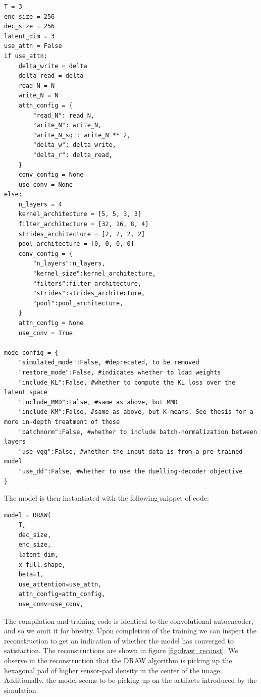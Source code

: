 \begin{lstlisting}[language=iPython]
T = 3
enc_size = 256
dec_size = 256
latent_dim = 3
use_attn = False
if use_attn:
    delta_write = delta
    delta_read = delta
    read_N = N
    write_N = N
    attn_config = {
        "read_N": read_N,
        "write_N": write_N,
        "write_N_sq": write_N ** 2,
        "delta_w": delta_write,
        "delta_r": delta_read,
    }
    conv_config = None
    use_conv = None
else:
    n_layers = 4
    kernel_architecture = [5, 5, 3, 3]
    filter_architecture = [32, 16, 8, 4]
    strides_architecture = [2, 2, 2, 2]
    pool_architecture = [0, 0, 0, 0]
    conv_config = {
        "n_layers":n_layers,
        "kernel_size":kernel_architecture,
        "filters":filter_architecture,
        "strides":strides_architecture,
        "pool":pool_architecture,
    }
    attn_config = None
    use_conv = True
    
mode_config = {
    "simulated_mode":False, #deprecated, to be removed
    "restore_mode":False, #indicates whether to load weights 
    "include_KL":False, #whether to compute the KL loss over the latent space
    "include_MMD":False, #same as above, but MMD 
    "include_KM":False, #same as above, but K-means. See thesis for a more in-depth treatment of these
    "batchnorm":False, #whether to include batch-normalization between layers
    "use_vgg":False, #whether the input data is from a pre-trained model 
    "use_dd":False, #whether to use the duelling-decoder objective 
}
\end{lstlisting}
The model is then instantiated with the following snippet of code:
\begin{lstlisting}[language=iPython]
model = DRAW(
    T,
    dec_size,
    enc_size,
    latent_dim,
    x_full.shape,
    beta=1,
    use_attention=use_attn,
    attn_config=attn_config,
    use_conv=use_conv,

\end{lstlisting}

\noindent The compilation and training code is identical to the convolutional autoencoder, and so we omit it for brevity. Upon completion of the training we can inspect the reconstruction to get an indication of whether the model has converged to satisfaction. The reconstructions are shown in figure \ref{fig:draw_reconst}. We observe in the reconstruction that the DRAW algorithm is picking up the hexagonal pad of higher sensor-pad density in the center of the image. Additionally, the model seems to be picking  up on the artifacts introduced by the simulation.

